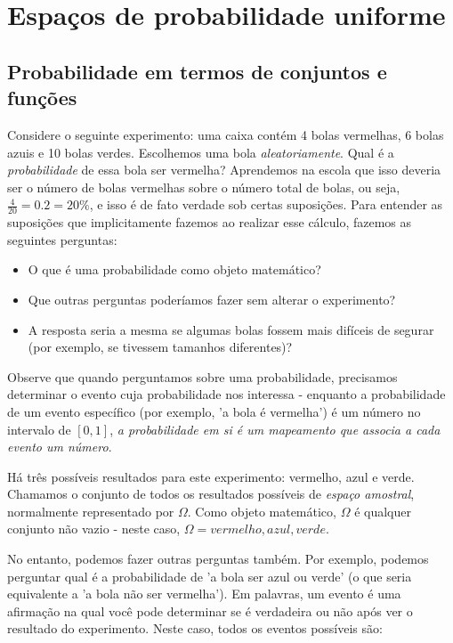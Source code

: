 


\section{Espaços de probabilidade uniforme}
\label{uniform probability spaces}

\subsection{Probabilidade em termos de conjuntos e funções}

Considere o seguinte experimento: uma caixa contém 4 bolas vermelhas, 6 bolas azuis e 10 bolas verdes. Escolhemos uma bola \emph{aleatoriamente}. Qual é a \emph{probabilidade} de essa bola ser vermelha? Aprendemos na escola que isso deveria ser o número de bolas vermelhas sobre o número total de bolas, ou seja, $\frac{4}{20}=0.2=20\%$, e isso é de fato verdade sob certas suposições. Para entender as suposições que implicitamente fazemos ao realizar esse cálculo, fazemos as seguintes perguntas:

\begin{itemize}
\item O que é uma probabilidade como objeto matemático?
\item Que outras perguntas poderíamos fazer sem alterar o experimento?
\item A resposta seria a mesma se algumas bolas fossem mais difíceis de segurar (por exemplo, se tivessem tamanhos diferentes)?
\end{itemize}
Observe que quando perguntamos sobre uma probabilidade, precisamos determinar o evento cuja probabilidade nos interessa - enquanto a probabilidade de um evento específico (por exemplo, 'a bola é vermelha') é um número no intervalo de $[0,1]$, \emph{a probabilidade em si é um mapeamento que associa a cada evento um número}.

Há três possíveis resultados para este experimento: vermelho, azul e verde. Chamamos o conjunto de todos os resultados possíveis de \emph{espaço amostral}, normalmente representado por $\Omega$. Como objeto matemático, $\Omega$ é qualquer conjunto não vazio - neste caso, $\Omega = {vermelho, azul, verde}$.

No entanto, podemos fazer outras perguntas também. Por exemplo, podemos perguntar qual é a probabilidade de 'a bola ser azul ou verde' (o que seria equivalente a 'a bola não ser vermelha'). Em palavras, um evento é uma afirmação na qual você pode determinar se é verdadeira ou não após ver o resultado do experimento. Neste caso, todos os eventos possíveis são:

